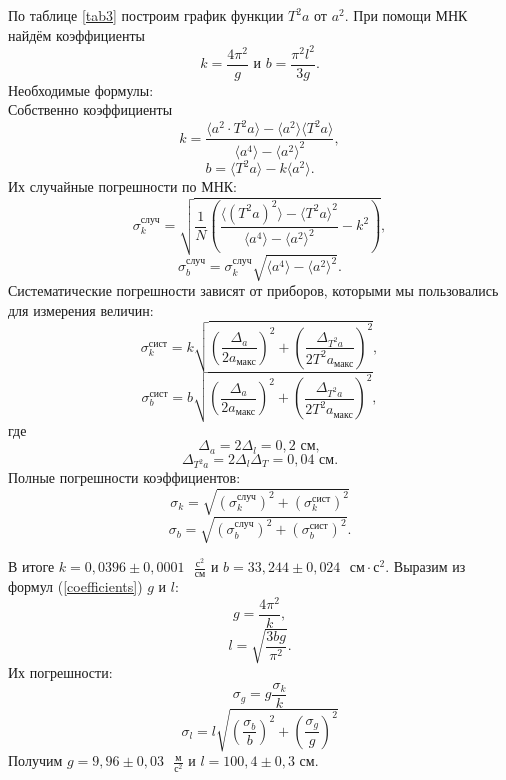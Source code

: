 \documentclass{article}
\begin{document}
По таблице \ref{tab3} построим график функции \(T^{2}a \text{ от } a^{2}\). При помощи МНК найдём коэффициенты
\begin{equation}
k=\dfrac{4\pi^2}{g}\text{ и } b =\dfrac{\pi^2l^2}{3g}.
\label{coefficients}
\end{equation}
Необходимые формулы: \\
Собственно коэффициенты
\[
k=\frac{\langle a^2\cdot T^2a\rangle-\langle a^2\rangle \langle T^2a\rangle}{\langle a^4\rangle - \langle a^2\rangle^2},
\]
\[
b=\langle T^2a \rangle -k\langle a^2 \rangle.
\]
Их случайные погрешности по МНК:
\[
\sigma_k^\text{случ}=\sqrt{\frac{1}{N}\left(\frac{\langle \left(T^2a\right) ^2 \rangle - \langle T^2a \rangle^2}{\langle a^4 \rangle - \langle a^2 \rangle^2} - k^2 \right) },
\]
\[
\sigma_b^\text{случ}= \sigma_k^\text{случ} \sqrt{\langle a^4 \rangle - \langle a^2  \rangle^2}.
\]
Систематические погрешности зависят от приборов, которыми мы пользовались для измерения величин:
\[
\sigma^\text{сист}_k = k\sqrt{\left(\frac{\Delta_{a}}{2a_\text{макс}} \right)^2 + \left(\frac{\Delta_{T^2a}}{2T^2a_{\text{макс}}} \right)^2 },
\]
\[
\sigma^\text{сист}_b = b\sqrt{\left(\frac{\Delta_{a}}{2a_\text{макс}} \right)^2 + \left(\frac{\Delta_{T^2a}}{2T^2a_{\text{макс}}} \right)^2 },
\]
где 
\[\Delta_{a} = 2\Delta_{l} = 0,2 \text{ см},\] 
\[\Delta_{T^2a} = 2\Delta_{l}  \Delta_{T} = 0,04 \text{ см}.\]
Полные погрешности коэффициентов:
\[
\sigma_k = \sqrt{\left( \sigma_k^\text{случ} \right)^2 + \left( \sigma_k^\text{сист} \right)^2 }
\]
\[
\sigma_b = \sqrt{\left( \sigma_b^\text{случ} \right)^2 + \left( \sigma_b^\text{сист} \right)^2 }.	
\]

В итоге \(k=0,0396\pm0,0001 \text{ }\frac{\text{с}^2}{\text{см}}\) и \(b=33,244\pm0,024 \text{ }\text{см}\cdot\text{с}^2\). Выразим из формул (\ref{coefficients}) \(g\) и \(l\):
\[
g = \frac{4\pi^2}{k},
\]
\[
l=\sqrt{\frac{3bg}{\pi^2}}.
\]
Их погрешности:
\[
\sigma_g = g\frac{\sigma_k}{k}
\]
\[
\sigma_l = l\sqrt{\left( \frac{\sigma_b}{b}\right)^2 + \left( \frac{\sigma_g}{g}\right)^2}
\]
Получим \underline{\(g=9,96\pm0,03 \text{ } \frac{\text{м}}{\text{с}^2}\)} и \underline{\(l=100,4\pm0,3 \text{ см}\)}. 
\end{document}
